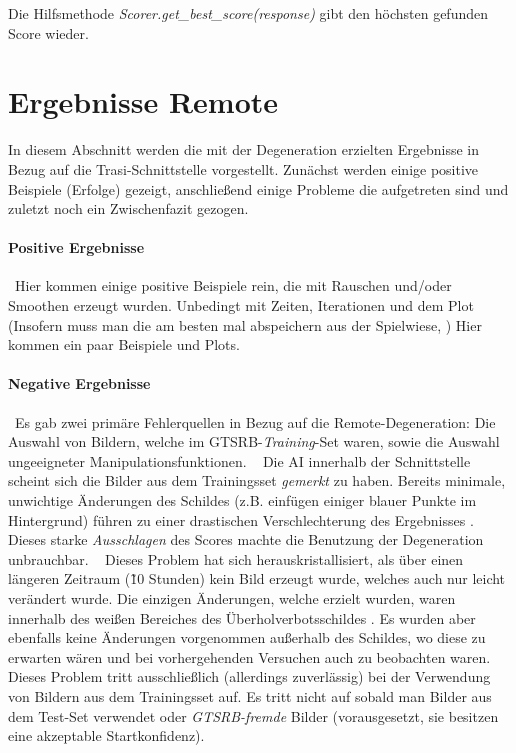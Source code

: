 Die Hilfsmethode \textit{Scorer.get\_best\_score(response)} gibt den höchsten gefunden Score wieder.
\newpage
\begin{small}
\end{small}
\section{Ergebnisse Remote}
In diesem Abschnitt werden die mit der Degeneration erzielten Ergebnisse in Bezug auf die Trasi-Schnittstelle vorgestellt. Zunächst werden einige positive Beispiele (Erfolge) gezeigt, anschließend einige Probleme die aufgetreten sind und zuletzt noch ein Zwischenfazit gezogen. 
\paragraph{Positive Ergebnisse} ~\newline Hier kommen einige positive Beispiele rein, die mit Rauschen und/oder Smoothen erzeugt wurden. Unbedingt mit Zeiten, Iterationen und dem Plot (Insofern muss man die am besten mal abspeichern aus der Spielwiese, )
Hier kommen ein paar Beispiele und Plots. 

\paragraph{Negative Ergebnisse} ~\newline Es gab zwei primäre Fehlerquellen in Bezug auf die Remote-Degeneration: Die Auswahl von Bildern, welche im GTSRB-\textit{Training}-Set waren, sowie die Auswahl ungeeigneter Manipulationsfunktionen. 
~\newline
Die AI innerhalb der Schnittstelle scheint sich die Bilder aus dem Trainingsset \textit{gemerkt} zu haben. Bereits minimale, unwichtige Änderungen des Schildes (z.B. einfügen einiger blauer Punkte im Hintergrund) führen zu einer drastischen Verschlechterung des Ergebnisses . Dieses starke \textit{Ausschlagen} des Scores machte die Benutzung der Degeneration unbrauchbar.
~\newline
Dieses Problem hat sich herauskristallisiert, als über einen längeren Zeitraum (\~ 10 Stunden) kein Bild erzeugt wurde, welches auch nur leicht verändert wurde. Die einzigen Änderungen, welche erzielt wurden, waren innerhalb des weißen Bereiches des Überholverbotsschildes . Es wurden aber ebenfalls keine Änderungen vorgenommen außerhalb des Schildes, wo diese zu erwarten wären und bei vorhergehenden Versuchen auch zu beobachten waren. 
~\newline
Dieses Problem tritt ausschließlich (allerdings zuverlässig) bei der Verwendung von Bildern aus dem Trainingsset auf. Es tritt nicht auf sobald man Bilder aus dem Test-Set verwendet oder \textit{GTSRB-fremde} Bilder (vorausgesetzt, sie besitzen eine akzeptable Startkonfidenz). 

